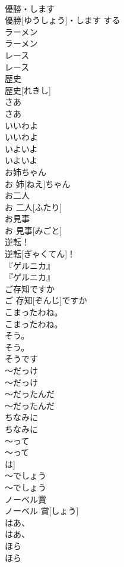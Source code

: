 \documentclass[8pt]{extreport}
\begin{document}
\begin{CJK}{UTF8}{min}
\\	優勝・します	
\\	優勝[ゆうしょう]・します	する	
\\	ラーメン	
\\	ラーメン		
\\	レース	
\\	レース		
\\	歴史	
\\	歴史[れきし]		
\\	さあ	
\\	さあ		
\\	いいわよ	
\\	いいわよ		
\\	いよいよ	
\\	いよいよ		
\\	お姉ちゃん	
\\	お 姉[ねえ]ちゃん		
\\	お二人	
\\	お 二人[ふたり]		
\\	お見事	
\\	お 見事[みごと]		
\\	逆転！	
\\	逆転[ぎゃくてん]！		
\\	『ゲルニカ』	
\\	『ゲルニカ』		
\\	ご存知ですか	
\\	ご 存知[ぞんじ]ですか		
\\	こまったわね。	
\\	こまったわね。		
\\	そう。	
\\	そう。	
\\	そうです 
\\	〜だっけ	
\\	〜だっけ		
\\	〜だったんだ	
\\	〜だったんだ		
\\	ちなみに	
\\	ちなみに		
\\	〜って	
\\	〜って	
\\	は]	
\\	〜でしょう	
\\	〜でしょう		
\\	ノーベル賞	
\\	ノーベル 賞[しょう]		
\\	はあ、	
\\	はあ、		
\\	ほら	
\\	ほら		

\end{CJK}
\end{document}
